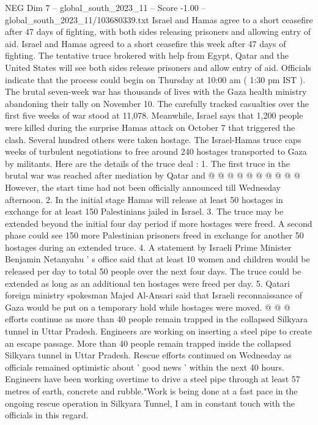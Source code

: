 \begin{textsample}{NEG Dim 7 – global\_south\_2023\_11 – Score -1.00 – global\_south\_2023\_11/103680339.txt}  \label{ex:f7_neg_156}
Israel and Hamas agree to a short ceasefire after 47 days of fighting, with both sides releasing prisoners and allowing entry of aid.
Israel and Hamas agreed to a short ceasefire this week after 47 days of fighting.
The tentative truce brokered with help from Egypt, Qatar and the United States will see both sides release prisoners and allow entry of aid.
Officials indicate that the process could begin on Thursday at 10:00 am ( 1:30 pm IST ).
The brutal seven-week war has thousands of lives with the Gaza health ministry abandoning their tally on November 10.
The carefully tracked casualties over the first five weeks of war stood at 11,078.
Meanwhile, Israel says that 1,200 people were killed during the surprise Hamas attack on October 7 that triggered the clash.
Several hundred others were taken hostage.
The Israel-Hamas truce caps weeks of turbulent negotiations to free around 240 hostages transported to Gaza by militants.
Here are the details of the truce deal : 1.
The first truce in the brutal war was reached after mediation by Qatar and @ @ @ @ @ @ @ @ @ @ However, the start time had not been officially announced till Wednesday afternoon. 2.
In the initial stage Hamas will release at least 50 hostages in exchange for at least 150 Palestinians jailed in Israel. 3.
The truce may be extended beyond the initial four day period if more hostages were freed.
A second phase could see 150 more Palestinian prisoners freed in exchange for another 50 hostages during an extended truce. 4.
A statement by Israeli Prime Minister Benjamin Netanyahu ' s office said that at least 10 women and children would be released per day to total 50 people over the next four days.
The truce could be extended as long as an additional ten hostages were freed per day. 5.
Qatari foreign ministry spokesman Majed Al-Ansari said that Israeli reconnaissance of Gaza would be put on a temporary hold while hostages were moved. @ @ @ efforts continue as more than 40 people remain trapped in the collapsed Silkyara tunnel in Uttar Pradesh.
Engineers are working on inserting a steel pipe to create an escape passage.
More than 40 people remain trapped inside the collapsed Silkyara tunnel in Uttar Pradesh.
Rescue efforts continued on Wednesday as officials remained optimistic about ' good news ' within the next 40 hours.
Engineers have been working overtime to drive a steel pipe through at least 57 metres of earth, concrete and rubble."Work is being done at a fast pace in the ongoing rescue operation in Silkyara Tunnel, I am in constant touch with the officials in this regard.

\end{textsample}
